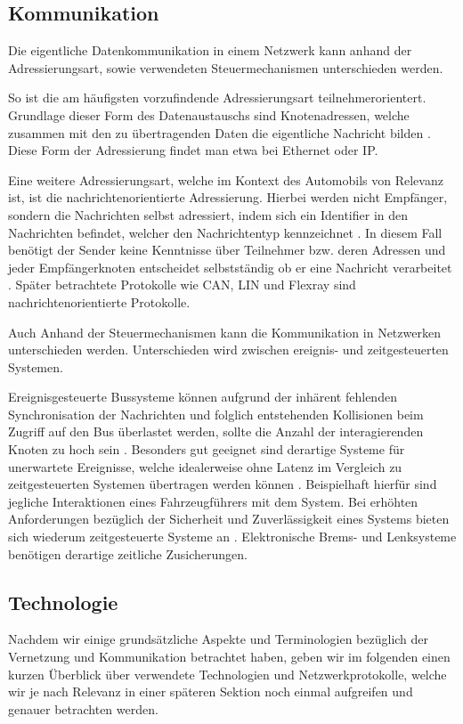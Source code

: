     \subsection{Kommunikation}
    Die eigentliche Datenkommunikation in einem Netzwerk kann anhand der Adressierungsart, sowie verwendeten Steuermechanismen unterschieden werden. 

    So ist die am häufigsten vorzufindende Adressierungsart teilnehmerorientert. Grundlage dieser Form des Datenaustauschs sind Knotenadressen, welche zusammen mit den
    zu übertragenden Daten die eigentliche Nachricht bilden \cite{reif2011bosch}. Diese Form der Adressierung findet man etwa bei Ethernet oder IP. 

    Eine weitere Adressierungsart, welche im Kontext des Automobils von Relevanz ist, ist die nachrichtenorientierte Adressierung. Hierbei werden nicht Empfänger, sondern die Nachrichten selbst
    adressiert, indem sich ein Identifier in den Nachrichten befindet, welcher den Nachrichtentyp kennzeichnet \cite{reif2011bosch}. In diesem Fall benötigt der Sender keine 
    Kenntnisse über Teilnehmer bzw. deren Adressen und jeder Empfängerknoten entscheidet selbstständig ob er eine Nachricht verarbeitet \cite{reif2011bosch}. Später betrachtete
    Protokolle wie CAN, LIN und Flexray sind nachrichtenorientierte Protokolle.

    Auch Anhand der Steuermechanismen kann die Kommunikation in Netzwerken unterschieden werden. Unterschieden wird zwischen ereignis- und zeitgesteuerten Systemen.

    Ereignisgesteuerte Bussysteme können aufgrund der inhärent fehlenden Synchronisation der Nachrichten und folglich entstehenden Kollisionen beim Zugriff auf den Bus
    überlastet werden, sollte die Anzahl der interagierenden Knoten zu hoch sein \cite{reif2011bosch}. Besonders gut geeignet sind derartige Systeme für unerwartete Ereignisse,
    welche idealerweise ohne Latenz im Vergleich zu zeitgesteuerten Systemen übertragen werden können \cite{reif2011bosch}. Beispielhaft hierfür sind jegliche Interaktionen eines 
    Fahrzeugführers mit dem System. Bei erhöhten Anforderungen bezüglich der Sicherheit und Zuverlässigkeit eines Systems bieten sich wiederum zeitgesteuerte Systeme an \cite{reif2011bosch}.
    Elektronische Brems- und Lenksysteme benötigen derartige zeitliche Zusicherungen.
    \subsection{Technologie}
    Nachdem wir einige grundsätzliche Aspekte und Terminologien bezüglich der Vernetzung und Kommunikation betrachtet haben, geben wir im folgenden einen kurzen Überblick
    über verwendete Technologien und Netzwerkprotokolle, welche wir je nach Relevanz in einer späteren Sektion noch einmal aufgreifen und genauer betrachten werden.
